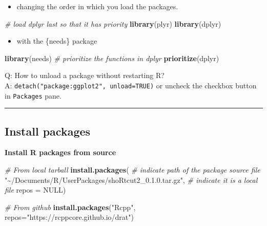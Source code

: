 \documentclass[
  a4paper,
  twoside,
  openright]{book}
\newenvironment{Shaded}{\begin{snugshade}}{\end{snugshade}}
\newcommand{\AttributeTok}[1]{\textcolor[rgb]{0.13,0.29,0.53}{#1}}
\newcommand{\CommentTok}[1]{\textcolor[rgb]{0.56,0.35,0.01}{\textit{#1}}}
\newcommand{\ConstantTok}[1]{\textcolor[rgb]{0.56,0.35,0.01}{#1}}
\newcommand{\FunctionTok}[1]{\textcolor[rgb]{0.13,0.29,0.53}{\textbf{#1}}}
\newcommand{\NormalTok}[1]{#1}
\newcommand{\StringTok}[1]{\textcolor[rgb]{0.31,0.60,0.02}{#1}}
\providecommand{\tightlist}{%
  \setlength{\itemsep}{0pt}\setlength{\parskip}{0pt}}
\theoremstyle{definition}
\theoremstyle{definition}
\theoremstyle{definition}
\theoremstyle{definition}
\theoremstyle{remark}
\begin{document}
\begin{itemize}
\tightlist
\item
  changing the order in which you load the packages.
\end{itemize}

\begin{Shaded}
\begin{Highlighting}[]
\CommentTok{\# load dplyr last so that it has priority}
\FunctionTok{library}\NormalTok{(plyr)}
\FunctionTok{library}\NormalTok{(dplyr)}
\end{Highlighting}
\end{Shaded}

\begin{itemize}
\tightlist
\item
  with the \{needs\} package
\end{itemize}

\begin{Shaded}
\begin{Highlighting}[]
\FunctionTok{library}\NormalTok{(needs)}
\CommentTok{\# prioritize the functions in dplyr}
\FunctionTok{prioritize}\NormalTok{(dplyr) }
\end{Highlighting}
\end{Shaded}

Q: How to unload a package without restarting R?\\
A: \texttt{detach("package:ggplot2",\ unload=TRUE)} or uncheck the checkbox button in \texttt{Packages} pane.

\begin{center}\rule{0.5\linewidth}{0.5pt}\end{center}

\subsection{Install packages}\label{install-packages}

\textbf{Install R packages from source}

\begin{Shaded}
\begin{Highlighting}[]
\CommentTok{\# From local tarball}
\FunctionTok{install.packages}\NormalTok{(}
  \CommentTok{\# indicate path of the package source file}
  \StringTok{"\textasciitilde{}/Documents/R/UserPackages/shoRtcut2\_0.1.0.tar.gz"}\NormalTok{, }
  \CommentTok{\# indicate it is a local file}
  \AttributeTok{repos =} \ConstantTok{NULL}\NormalTok{)}

\CommentTok{\# From github}
\FunctionTok{install.packages}\NormalTok{(}\StringTok{"Rcpp"}\NormalTok{, }\AttributeTok{repos=}\StringTok{"https://rcppcore.github.io/drat"}\NormalTok{)}
\end{Highlighting}
\end{Shaded}
\end{document}

